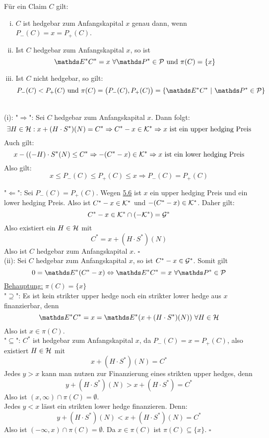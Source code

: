 Für ein Claim $C$ gilt:
\begin{enumerate}[(i)]
	\item $C$ ist hedgebar zum Anfangskapital $x$ genau dann, wenn $P_-(C)=x=P_+(C)$.
	\item Ist $C$ hedgebar zum Anfangskapital $x$, so ist
	\[
	\E^*C^*=x~\forall \Pw^*\in\mc{P} \text{ und } \pi(C)=\{x\}
	\]
	\item Ist $C$ nicht hedgebar, so gilt:
	\[
	P_-(C)<P_+(C)\text{ und } \pi(C)=\big(P_-(C),P_+(C)\big)=\penbrace{\E^*C^*~|~\Pw^*\in\mc{P}}
	\]
\end{enumerate}

\\
(i): "$\Rightarrow$":
Sei $C$ hedgebar zum Anfangskapital $x$.
Dann folgt:
\[
\exists H\in\mathcal{H}: x+(H\cdot S^*)(N)=C^* \Rightarrow C^*-x\in \mathcal{K}^* \Rightarrow x\text{ ist ein upper hedging Preis}
\]
Auch gilt:
\[
x-((-H)\cdot S^*(N)\le C^* \Rightarrow -(C^*-x)\in\mathcal{K}^* \Rightarrow x\text{ ist ein lower hedging Preis}
\]
Also gilt:
\[
x\le P_-(C)\le P_+(C)\le x \Rightarrow P_-(C)=P_+(C)
\]

"$\Leftarrow$":
Sei $P_-(C)=P_+(C)$.
Wegen \hyperref[sub:upper_lower_preise]{5.6} ist $x$ ein upper hedging Preis und ein lower hedging Preis.
Also ist $C^*-x\in \mathcal{K}^*$ und $-(C^*-x)\in\mathcal{K}^*$.
Daher gilt:
\[
C^*-x\in \mathcal{K}^*\cap (-\mathcal{K^*})=\mathcal{G}^*
\]
Also existiert ein $H\in\mathcal{H}$ mit 
\[
C^*= x+(H\cdot S^*)(N)
\]
Also ist $C$ hedgebar zum Anfangskapital $x$.
\hfill $\square$\\

(ii):
Sei $C$ hedgebar zum Anfangskapital $x$, so ist $C^*-x\in\mathcal{G}^*$.
Somit gilt
\[
0=\E^*(C^*-x) \Leftrightarrow \E^*C^*=x~\forall \Pw^*\in\mc{P}
\]
\uline{Behauptung:}
$\pi(C)=\{x\}$\\
"$\supseteq$":
Es ist kein strikter upper hedge noch ein strikter lower hedge aus $x$ finanzierbar, denn 
\[
\E^*C^* = x =  \E^*(x+(H\cdot S^*)(N))~\forall H\in\mc{H}
\]
Also ist $x\in\pi(C)$.\\

"$\subseteq$":
$C^*$ ist hedgebar zum Anfangskapital $x$, da $P_-(C)=x=P_+(C)$, also existiert $H\in\mathcal{H}$ mit
\[
x+(H\cdot S^*)(N)=C^*
\]
Jedes $y>x$ kann man nutzen zur Finanzierung eines strikten upper hedges, denn 
\[
y+(H\cdot S^*)(N)>x+(H\cdot S^*)=C^*
\]
Also ist $(x,\infty)\cap \pi(C)=\emptyset$.\\
Jedes $y<x$ lässt ein strikten lower hedge finanzieren.
Denn:
\[
y+(H\cdot S^*)(N)<x+(H\cdot S^*)(N)=C^*
\]
Also ist $(-\infty,x)\cap\pi(C)=\emptyset$.
Da $x\in\pi(C)$ ist $\pi(C)\subseteq \{x\}$.
\hfill $\square$\\

